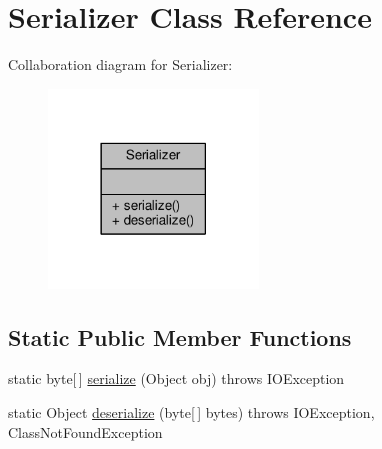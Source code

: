 \hypertarget{a00014}{\section{Serializer Class Reference}
\label{a00014}
}


Collaboration diagram for Serializer\+:
\nopagebreak
\begin{figure}[H]
\begin{center}
\leavevmode
\includegraphics[width=158pt]{a00047}
\end{center}
\end{figure}
\subsection*{Static Public Member Functions}
\begin{DoxyCompactItemize}
\item 
static byte\mbox{[}$\,$\mbox{]} \hyperlink{a00014_a1331717cb2a54bf8a95a0555403da236}{serialize} (Object obj)  throws I\+O\+Exception 
\item 
static Object \hyperlink{a00014_a79bdcf2199693e6c879cdd89c30926b9}{deserialize} (byte\mbox{[}$\,$\mbox{]} bytes)  throws I\+O\+Exception, Class\+Not\+Found\+Exception 
\end{DoxyCompactItemize}


